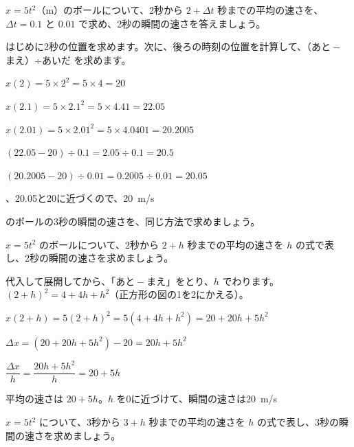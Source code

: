 
\begin{reidai}[表で近づき方を見る]
$x=5t^2$（m）のボールについて、2秒から $2+\Delta t$ 秒までの平均の速さを、$\Delta t=0.1$ と $0.01$ で求め、2秒の瞬間の速さを答えましょう。\par
\kangaekata はじめに2秒の位置を求めます。次に、後ろの時刻の位置を計算して、（あと${}-{}$まえ）÷あいだ を求めます。\par
\shiki $x(2)=5\times2^2=5\times4=20$\par
\hspace*{2.6\zw}$x(2.1)=5\times2.1^2=5\times4.41=22.05$\par
\hspace*{2.6\zw}$x(2.01)=5\times2.01^2=5\times4.0401=20.2005$\par
\hspace*{2.6\zw}$(22.05-20)\div0.1=2.05\div0.1=20.5$\par
\hspace*{2.6\zw}$(20.2005-20)\div0.01=0.2005\div0.01=20.05$\par
{}、20.05と20に近づくので、\qty{20}{m/s}
\end{reidai}

\begin{jibun}
のボールの3秒の瞬間の速さを、同じ方法で求めましょう。
\end{jibun}

\begin{reidai}[$h$ の式で表す]
$x=5t^2$ のボールについて、2秒から $2+h$ 秒までの平均の速さを $h$ の式で表し、2秒の瞬間の速さを求めましょう。\par
\kangaekata 代入して展開してから、「あと${}-{}$まえ」をとり、$h$ でわります。$(2+h)^2=4+4h+h^2$（正方形の図の1を2にかえる）。\par
\shiki $x(2+h)=5(2+h)^2=5(4+4h+h^2)=20+20h+5h^2$\par
\hspace*{2.6\zw}$\Delta x=(20+20h+5h^2)-20=20h+5h^2$\par
\hspace*{2.6\zw}$\dfrac{\Delta x}{h}=\dfrac{20h+5h^2}{h}=20+5h$\par
\kotae 平均の速さは $20+5h$。$h$ を0に近づけて、瞬間の速さは\qty{20}{m/s}
\end{reidai}

\begin{jibun}
$x=5t^2$ について、3秒から $3+h$ 秒までの平均の速さを $h$ の式で表し、3秒の瞬間の速さを求めましょう。
\end{jibun}

